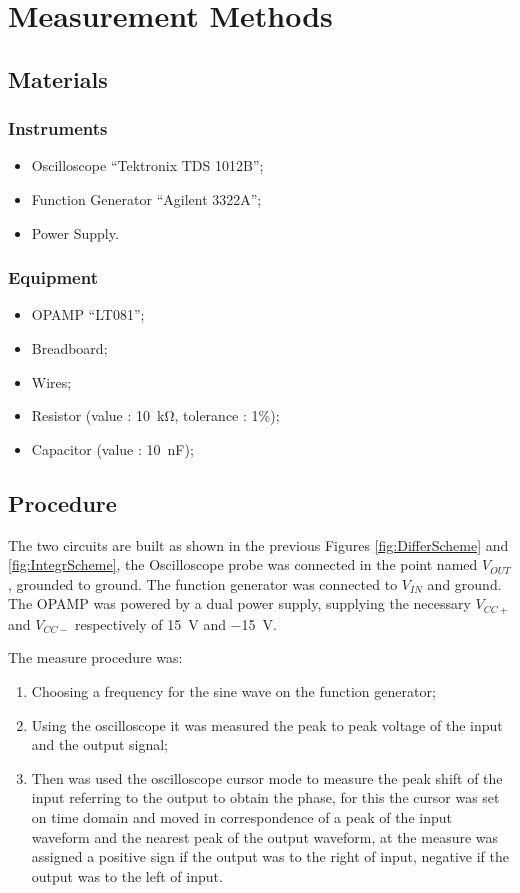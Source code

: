 \documentclass[a4paper, twocolumn]{article}
\begin{document}
\section{Measurement Methods}

\subsection{Materials}
\subsubsection{Instruments}
\begin{itemize}
    \item Oscilloscope ``Tektronix TDS 1012B'';
    \item Function Generator ``Agilent 3322A'';
    \item Power Supply.
\end{itemize}
\subsubsection{Equipment}
\begin{itemize}
    \item OPAMP ``LT081'';
    \item Breadboard;
    \item Wires;
    \item Resistor (value : \SI{10}{\kilo\ohm}, tolerance : 1\%);
    \item Capacitor (value : \SI{10}{\nano\farad});
\end{itemize}

\subsection{Procedure}

The two circuits are built as shown in the previous Figures \ref{fig:DifferScheme} and \ref{fig:IntegrScheme}, the Oscilloscope probe was connected in the point named \(V_{OUT}\), grounded to ground. The function generator was connected to \(V_{IN}\) and ground.   The OPAMP was powered by a dual power supply, supplying the necessary \(V_{CC+}\) and \(V_{CC-}\) respectively of \SI{15}{\volt} and \SI{-15}{\volt}.

The measure procedure was:
\begin{enumerate}
    \item Choosing a frequency for the sine wave on the function generator;
    \item Using the oscilloscope it was measured the peak to peak voltage of the input and the output signal;
    \item Then was used the oscilloscope cursor mode to measure the peak shift of the input referring to the output to obtain the phase, for this the cursor was set on time domain and moved in correspondence of a peak of the input waveform and the nearest peak of the output waveform, at the measure was assigned a positive sign if the output was to the right of input, negative if the output was to the left of input. 
\end{enumerate}
\end{document}
